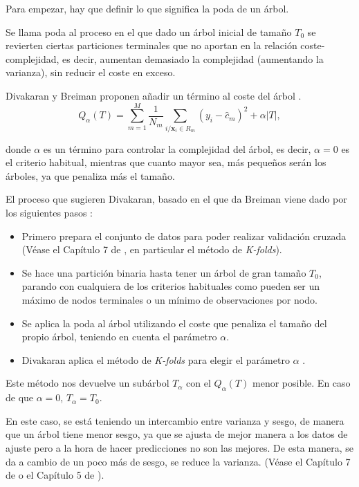 \noindent Para empezar, hay que definir lo que significa la poda de un árbol. 
\begin{defi}
Se llama poda al proceso en el que dado un árbol inicial de tamaño $T_0$ se revierten ciertas particiones terminales que no aportan en la relación coste-complejidad, es decir, aumentan demasiado la complejidad (aumentando la varianza), sin reducir el coste en exceso. 
\end{defi}


\noindent Divakaran y Breiman proponen añadir un término al coste del árbol \cite{Breiman 1984,Divakaran 2022}. 
\begin{equation}
Q_{\alpha}(T)=\sum_{m=1}^M\frac{1}{N_m}\sum_{i/\mathbf{x}_i\in R_m} (y_i-\hat{c}_m)^2+\alpha|T |,
\end{equation}

\noindent donde $\alpha$ es un término para controlar la complejidad del árbol, es decir, $\alpha=0$ es el criterio habitual, mientras que cuanto mayor sea, más pequeños serán los árboles, ya que penaliza más el tamaño.  

\noindent El proceso que sugieren Divakaran, basado en el que da Breiman  viene dado por los siguientes pasos \cite{Breiman 1984,Divakaran 2022}:
\begin{itemize}
\item Primero prepara el conjunto de datos para poder realizar validación cruzada (Véase el Capítulo 7 de \cite{Hastie 2001}, en particular el método de \emph{K-folds}).

\item Se hace una partición binaria hasta tener un árbol de gran tamaño $T_0$, parando con cualquiera de los criterios habituales como pueden ser un máximo de nodos terminales o un mínimo de observaciones por nodo. 

\item Se aplica la poda al árbol utilizando el coste que penaliza el tamaño del propio árbol, teniendo en cuenta el parámetro $\alpha$. 

\item Divakaran aplica el método de \emph{K-folds} para elegir el parámetro $\alpha$ \cite{Divakaran 2022}.
\end{itemize}

\noindent Este método nos devuelve un subárbol $T_{\alpha}$ con el $Q_{\alpha}(T)$ menor posible. En caso de que $\alpha=0$, $T_{\alpha}=T_0$.

\noindent En este caso, se está teniendo un intercambio entre varianza y sesgo, de manera que un árbol tiene menor sesgo, ya que se ajusta de mejor manera a los datos de ajuste pero a la hora de hacer predicciones no son las mejores. De esta manera, se da a cambio de un poco más de sesgo, se reduce la varianza. (Véase el Capítulo 7 de \cite{Hastie 2001} o el Capítulo 5 de \cite{James 2013}).

